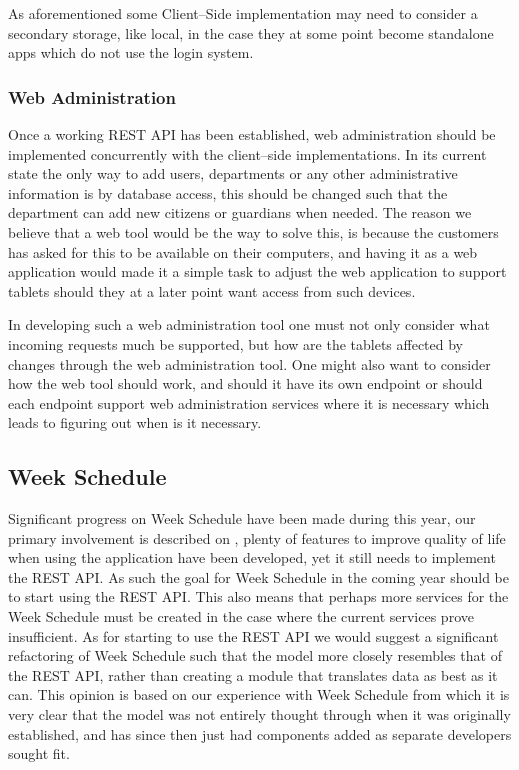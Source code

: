 As aforementioned some Client--Side implementation may need to consider a secondary storage, like local, in the case they at some point become standalone apps which do not use the login system.

\subsubsection*{Web Administration}
Once a working REST API has been established, web administration should be implemented concurrently with the client--side implementations.
In its current state the only way to add users, departments or any other administrative information is by database access, this should be changed such that the department can add new citizens or guardians when needed.
The reason we believe that a web tool would be the way to solve this, is because the customers has asked for this to be available on their computers, and having it as a web application would made it a simple task to adjust the web application to support tablets should they at a later point want access from such devices.

In developing such a web administration tool one must not only consider what incoming requests much be supported, but how are the tablets affected by changes through the web administration tool.
One might also want to consider how the web tool should work, and should it have its own endpoint or should each endpoint support web administration services where it is necessary which leads to figuring out when is it necessary.

\subsection*{Week Schedule}
Significant progress on Week Schedule have been made during this year, our primary involvement is described on , plenty of features to improve quality of life when using the application have been developed, yet it still needs to implement the REST API.
As such the goal for Week Schedule in the coming year should be to start using the REST API.
This also means that perhaps more services for the Week Schedule must be created in the case where the current services prove insufficient.
As for starting to use the REST API we would suggest a significant refactoring of Week Schedule such that the model more closely resembles that of the REST API, rather than creating a module that translates data as best as it can.
This opinion is based on our experience with Week Schedule from which it is very clear that the model was not entirely thought through when it was originally established, and has since then just had components added as separate developers sought fit.

